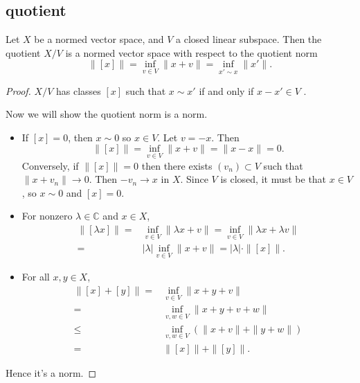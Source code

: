 \documentclass[12pt]{article}
\begin{document}
\begin{refsection}
\subsection{quotient} %

\begin{proposition}
\label{prop_quotient_nvs}
	Let $X$ be a normed vector space, and $V$ a closed linear subspace. Then the quotient $X/V$ is a normed vector space with respect to the quotient norm 
	\begin{equation*}
		\|[x]\| = \inf_{v\in V}\|x + v\| = \inf_{x'\sim x}\|x'\|.
	\end{equation*}
\end{proposition}
\begin{proof}
	$X/V$ has classes $[x]$ such that $x\sim x'$ if and only if $x-x'\in V$ .  

	Now we will show the quotient norm is a norm.
	\begin{itemize}
		\item If $[x]=0$, then $x\sim 0$ so $x\in V$. Let $v=-x$. Then 
			\begin{equation*}
				\|[x]\| = \inf_{v\in V}\|x + v\| = \|x-x\| = 0.
			\end{equation*}
			Conversely, if $\|[x]\|=0$ then there exists $(v_n)\subset V$ such that $\|x+v_n\|\to 0$. Then $-v_n\to x$ in $X$. Since $V$ is closed, it must be that $x\in V$, so $x\sim 0$ and $[x]=0$. 
		\item For nonzero $\lambda\in\mathbb{C}$ and $x\in X$, 
			\begin{align*}
				\|[\lambda x]\|
				=& \inf_{v\in V}\|\lambda x + v\| = \inf_{v\in V}\|\lambda x + \lambda v\| \\
				=& |\lambda| \inf_{v\in V} \|x + v\| = |\lambda|\cdot \|[x]\|.
			\end{align*}
		\item For all $x,y\in X$, 
			\begin{align*}
				\|[x] + [y]\|
				=& \inf_{v\in V} \|x+y+v\| \\
				=& \inf_{v,w\in V} \|x+y+v+w\| \\
				\leq& \inf_{v,w\in V} (\|x+v\| + \|y+w\|) \\
				=& \|[x]\| + \|[y]\|.
			\end{align*}
	\end{itemize}
	Hence it's a norm.
\end{proof}


\end{refsection}
\end{document}
